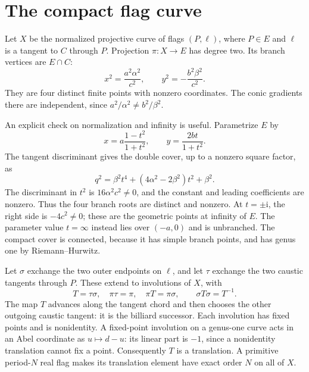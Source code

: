 \documentclass[11pt]{article}
\newcommand{\ii}{\mathrm i}
\begin{document}
\section{The compact flag curve}

Let \(X\) be the normalized projective curve of flags \((P,\ell)\), where
\(P\in E\) and \(\ell\) is a tangent to \(C\) through \(P\). Projection
\(\pi:X\to E\) has degree two. Its branch vertices are \(E\cap C\):
\begin{equation}\label{eq:branches}
 x^2=\frac{a^2\alpha^2}{c^2},\qquad
 y^2=-\frac{b^2\beta^2}{c^2}.
\end{equation}
They are four distinct finite points with nonzero coordinates. The conic
gradients there are independent, since
\(a^2/\alpha^2\ne b^2/\beta^2\).

An explicit check on normalization and infinity is useful. Parametrize
\(E\) by
\[
 x=a\frac{1-t^2}{1+t^2},\qquad y=\frac{2bt}{1+t^2}.
\]
The tangent discriminant gives the double cover, up to a nonzero square
factor, as
\begin{equation}\label{eq:quartic}
 q^2=\beta^2t^4+(4\alpha^2-2\beta^2)t^2+\beta^2.
\end{equation}
The discriminant in \(t^2\) is \(16\alpha^2c^2\ne0\), and the constant
and leading coefficients are nonzero. Thus the four branch roots are
distinct and nonzero. At \(t=\pm\ii\), the right side is
\(-4c^2\ne0\); these are the geometric points at infinity of \(E\).
The parameter value \(t=\infty\) instead lies over \((-a,0)\) and is
unbranched. The compact cover is connected, because it has simple branch
points, and has genus one by Riemann--Hurwitz.

Let \(\sigma\) exchange the two outer endpoints on \(\ell\), and let
\(\tau\) exchange the two caustic tangents through \(P\). These extend
to involutions of \(X\), with
\begin{equation}\label{eq:involutions}
 T=\tau\sigma,\quad \pi\tau=\pi,\quad \pi T=\pi\sigma,
 \qquad \sigma T\sigma=T^{-1}.
\end{equation}
The map \(T\) advances along the tangent chord and then chooses the
other outgoing caustic tangent: it is the billiard successor.
Each involution has fixed points and is nonidentity. A fixed-point
involution on a genus-one curve acts in an Abel coordinate as
\(u\mapsto d-u\): its linear part is \(-1\), since a nonidentity
translation cannot fix a point. Consequently \(T\) is a translation.
A primitive period-\(N\) real flag makes its translation element have
exact order \(N\) on all of \(X\).
\end{document}
